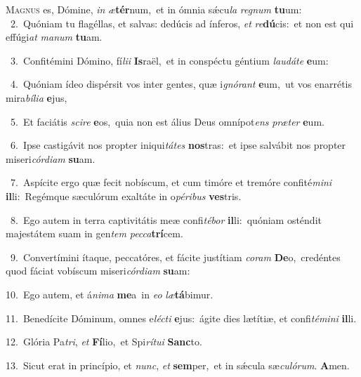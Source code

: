 \lettrine{\initial\textcolor{\initialcolor}{M}}{agnus} es, Dómine, \textit{in} \textit{æ}\-\textbf{tér}num,~\star et in ómnia sǽcu\textit{la} \textit{re}\-\textit{gnum} \textbf{tu}\-um:\\
{\numbfont\textcolor{\numbcolor}{~2.}}~Quóniam tu flagéllas, et salvas: dedúcis ad ínferos, \textit{et} \textit{re}\-\textbf{dú}cis:~\star et non est qui effúgi\textit{at} \textit{ma}\-\textit{num} \textbf{tu}\-am.\par
{\numbfont\textcolor{\numbcolor}{~3.}}~Confitémini Dómino, fí\-\textit{li}\-\textit{i} \textbf{Is}\-raël,~\star et in conspéctu géntium \textit{lau}\-\textit{dá}\textit{te} \textbf{e}\-um:\par
{\numbfont\textcolor{\numbcolor}{~4.}}~Quóniam ídeo dispérsit vos inter gentes, quæ i\-\textit{gnó}\-\textit{rant} \textbf{e}\-um,~\star ut vos enarrétis mira\-\textit{bí}\-\textit{li}\textit{a} \textbf{e}\-jus,\par
{\numbfont\textcolor{\numbcolor}{~5.}}~Et faciátis \textit{sci}\-\textit{re} \textbf{e}\-os,~\star quia non est álius Deus omnípot\textit{ens} \textit{præ}\-\textit{ter} \textbf{e}\-um.\par
{\numbfont\textcolor{\numbcolor}{~6.}}~Ipse castigávit nos propter iniqui\-\textit{tá}\-\textit{tes} \textbf{nos}\-tras:~\star et ipse salvábit nos propter miseri\-\textit{cór}\-\textit{di}\textit{am} \textbf{su}\-am.\par
{\numbfont\textcolor{\numbcolor}{~7.}}~Aspícite ergo quæ fecit nobíscum, et cum timóre et tremóre confité\-\textit{mi}\-\textit{ni} \textbf{il}\-li:~\star Regémque sæculórum exaltáte in o\-\textit{pé}\-\textit{ri}\textit{bus} \textbf{ves}\-tris.\par
{\numbfont\textcolor{\numbcolor}{~8.}}~Ego autem in terra captivitátis meæ confi\-\textit{té}\-\textit{bor} \textbf{il}\-li:~\star quóniam osténdit majestátem suam in gen\textit{tem} \textit{pec}\-\textit{ca}\textbf{trí}cem.\par
{\numbfont\textcolor{\numbcolor}{~9.}}~Convertímini ítaque, peccatóres, et fácite justítiam \textit{co}\-\textit{ram} \textbf{De}\-o,~\star credéntes quod fáciat vobíscum miseri\-\textit{cór}\-\textit{di}\textit{am} \textbf{su}\-am:\par
{\numbfont\textcolor{\numbcolor}{10.}}~Ego autem, et á\-\textit{ni}\-\textit{ma} \textbf{me}\-a~\star in \textit{e}\-\textit{o} \textit{læ}\-\textbf{tá}bimur.\par
{\numbfont\textcolor{\numbcolor}{11.}}~Benedícite Dóminum, omnes e\-\textit{léc}\-\textit{ti} \textbf{e}\-jus:~\star ágite dies lætítiæ, et confi\-\textit{té}\-\textit{mi}\textit{ni} \textbf{il}\-li.\par
{\numbfont\textcolor{\numbcolor}{12.}}~Glória Pa\-\textit{tri}\-, \textit{et} \textbf{Fí}\-lio,~\star et Spi\-\textit{rí}\-\textit{tu}\textit{i} \textbf{Sanc}\-to.\par
{\numbfont\textcolor{\numbcolor}{13.}}~Sicut erat in princípio, et \textit{nunc}\-, \textit{et} \textbf{sem}\-per,~\star et in sǽcula sæ\-\textit{cu}\-\textit{ló}\textit{rum}. \textbf{A}\-men.\par
